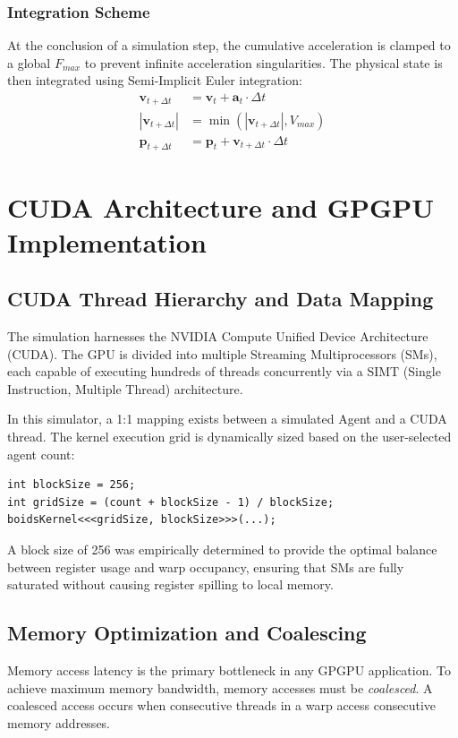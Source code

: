 \documentclass[12pt,a4paper]{report}
\begin{document}
\subsection{Integration Scheme}
At the conclusion of a simulation step, the cumulative acceleration is clamped to a global $F_{max}$ to prevent infinite acceleration singularities. The physical state is then integrated using Semi-Implicit Euler integration:
\begin{align}
\mathbf{v}_{t+\Delta t} &= \mathbf{v}_t + \mathbf{a}_t \cdot \Delta t \\
|\mathbf{v}_{t+\Delta t}| &= \min(|\mathbf{v}_{t+\Delta t}|, V_{max}) \\
\mathbf{p}_{t+\Delta t} &= \mathbf{p}_t + \mathbf{v}_{t+\Delta t} \cdot \Delta t
\end{align}

\chapter{CUDA Architecture and GPGPU Implementation}

\section{CUDA Thread Hierarchy and Data Mapping}
The simulation harnesses the NVIDIA Compute Unified Device Architecture (CUDA). The GPU is divided into multiple Streaming Multiprocessors (SMs), each capable of executing hundreds of threads concurrently via a SIMT (Single Instruction, Multiple Thread) architecture.

In this simulator, a 1:1 mapping exists between a simulated Agent and a CUDA thread. The kernel execution grid is dynamically sized based on the user-selected agent count:
\begin{lstlisting}[caption=Kernel Execution Configuration]
int blockSize = 256;
int gridSize = (count + blockSize - 1) / blockSize;
boidsKernel<<<gridSize, blockSize>>>(...);
\end{lstlisting}
A block size of 256 was empirically determined to provide the optimal balance between register usage and warp occupancy, ensuring that SMs are fully saturated without causing register spilling to local memory.

\section{Memory Optimization and Coalescing}
Memory access latency is the primary bottleneck in any GPGPU application. To achieve maximum memory bandwidth, memory accesses must be \textit{coalesced}. A coalesced access occurs when consecutive threads in a warp access consecutive memory addresses. 
\end{document}
